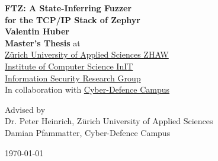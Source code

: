 \documentclass[twocolumn]{article}
\newcommand{\proj}{FTZ\xspace}
\begin{document}
\begin{titlepage}
  \large

  \begin{center}
    {\Huge\bfseries \proj : A State-Inferring Fuzzer\\[10pt]for the TCP/IP Stack of Zephyr}\\
    {\Large\bfseries Valentin Huber}\\
    {{\bfseries Master's Thesis} at}\\[1ex]
    \href{https://www.zhaw.ch/en/engineering/institutes-centres/init/information-security}{
      Zürich University of Applied Sciences ZHAW\\
      Institute of Computer Science InIT\\
      Information Security Research Group
    }\\[2ex]
    In collaboration with \href{https://www.cydcampus.admin.ch/}{Cyber-Defence Campus}\\

    Advised by\\
    Dr. Peter Heinrich, Zürich University of Applied Sciences\\
    Damian Pfammatter, Cyber-Defence Campus\\


    \today

  \end{center}
\end{titlepage}

\clearpage\newpage
\onecolumn
\end{document}
